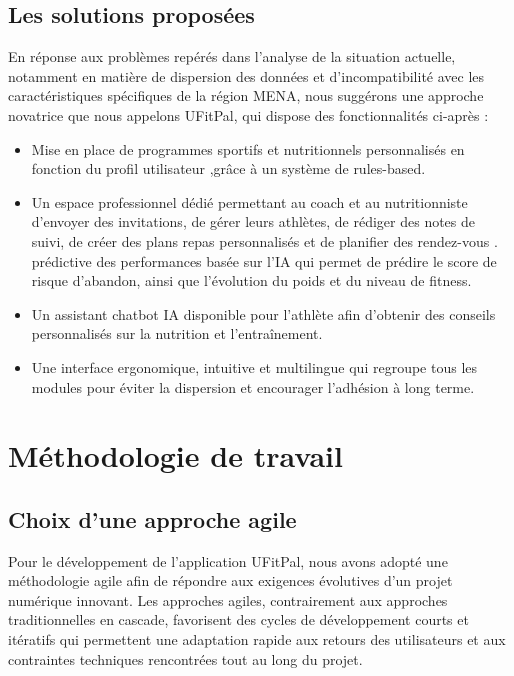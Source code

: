 \documentclass[a4paper,12pt]{report}
\begin{document}
\subsection{Les solutions proposées}
En réponse aux problèmes repérés dans l'analyse de la situation actuelle, notamment en matière de dispersion des données et d'incompatibilité avec les caractéristiques spécifiques de la région MENA, nous suggérons une approche novatrice que nous appelons UFitPal, qui dispose des fonctionnalités ci-après :

\begin{itemize}
\item  Mise en place de programmes sportifs et nutritionnels personnalisés en fonction du profil utilisateur ,grâce à un système de rules-based.

\item  Un espace professionnel dédié permettant au coach et au nutritionniste d'envoyer des invitations, de gérer leurs athlètes, 
de rédiger des notes de suivi, de créer des plans repas personnalisés et de planifier des rendez-vous .
 prédictive des performances basée sur l'IA qui permet de prédire le score de risque d'abandon, ainsi que l'évolution du poids et du niveau de fitness. 
\item Un assistant chatbot IA disponible pour l'athlète afin d'obtenir des conseils personnalisés sur la nutrition et l'entraînement.
 \item Une interface ergonomique, intuitive et multilingue qui regroupe tous les modules pour éviter la dispersion et encourager l'adhésion à long terme.
\end{itemize}

\section{Méthodologie de travail}

\subsection{Choix d'une approche agile}
Pour le développement de l'application UFitPal, nous avons adopté une méthodologie agile afin de répondre aux exigences évolutives d'un projet numérique innovant. Les approches agiles, contrairement 
 aux approches traditionnelles en cascade, favorisent des cycles de développement courts et itératifs 
 qui permettent une adaptation rapide aux retours des utilisateurs et aux contraintes techniques rencontrées tout au long du projet.
\end{document}
